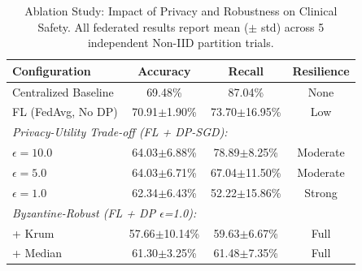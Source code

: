 \documentclass[conference]{IEEEtran}
\begin{document}
\begin{table}[htbp]
\caption{Ablation Study: Impact of Privacy and Robustness on Clinical Safety. All federated results report mean (\( \pm \) std) across 5 independent Non-IID partition trials.}
\begin{center}
\begin{tabular}{lccc}
\toprule
\textbf{Configuration} & \textbf{Accuracy} & \textbf{Recall} & \textbf{Resilience} \\
\midrule
Centralized Baseline & 69.48\% & 87.04\% & None \\
FL (FedAvg, No DP) & 70.91\scriptsize{\( \pm \)1.90}\% & 73.70\scriptsize{\( \pm \)16.95}\% & Low \\
\midrule
\multicolumn{4}{l}{\textit{Privacy-Utility Trade-off (FL + DP-SGD):}} \\
\quad \( \epsilon = 10.0 \) & 64.03\scriptsize{\( \pm \)6.88}\% & 78.89\scriptsize{\( \pm \)8.25}\% & Moderate \\
\quad \( \epsilon = 5.0 \) & 64.03\scriptsize{\( \pm \)6.71}\% & 67.04\scriptsize{\( \pm \)11.50}\% & Moderate \\
\quad \( \epsilon = 1.0 \) & 62.34\scriptsize{\( \pm \)6.43}\% & 52.22\scriptsize{\( \pm \)15.86}\% & Strong \\
\midrule
\multicolumn{4}{l}{\textit{Byzantine-Robust (FL + DP \( \epsilon \)=1.0):}} \\
\quad + Krum & 57.66\scriptsize{\( \pm \)10.14}\% & 59.63\scriptsize{\( \pm \)6.67}\% & Full \\
\quad + Median & 61.30\scriptsize{\( \pm \)3.25}\% & 61.48\scriptsize{\( \pm \)7.35}\% & Full \\
\bottomrule
\end{tabular}
\label{tab:performance}
\end{center}
\end{table}
\end{document}
